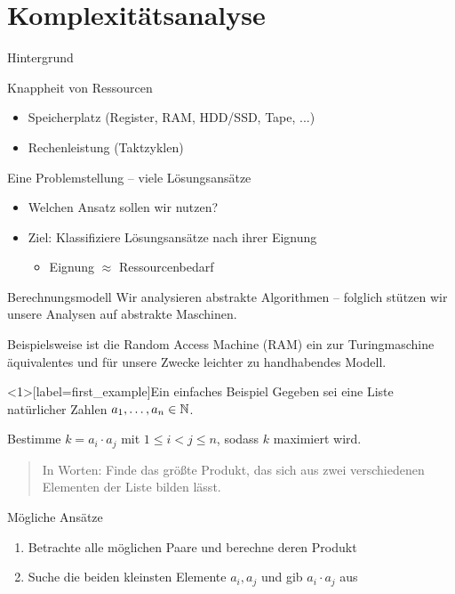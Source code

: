 \section{Komplexit\"atsanalyse}

\begin{frame}{Hintergrund}
\begin{block}{Knappheit von Ressourcen}
    \begin{itemize}
        \item Speicherplatz (Register, RAM, HDD/SSD, Tape, ...)
        \item \alert{Rechenleistung} (Taktzyklen)
    \end{itemize}
\end{block}

\begin{block}{Eine Problemstellung -- viele Lösungsansätze}
    \begin{itemize}
        \item Welchen Ansatz sollen wir nutzen?
        \item Ziel: Klassifiziere Lösungsansätze nach ihrer \alert{Eignung}
        \begin{itemize}
            \item Eignung $\approx$ Ressourcenbedarf
        \end{itemize}
    \end{itemize}
\end{block}
\end{frame}

\begin{frame}{Berechnungsmodell}
Wir analysieren \alert{abstrakte Algorithmen} -- folglich st\"utzen wir unsere Analysen auf \alert{abstrakte Maschinen}.

Beispielsweise ist die \alert{Random Access Machine (RAM)} ein zur \alert{Turingmaschine} \"aquivalentes und f\"ur unsere Zwecke leichter zu handhabendes Modell.
\end{frame}

\begin{frame}<1>[label=first_example]{Ein einfaches Beispiel}
Gegeben sei eine Liste natürlicher Zahlen $a_1, \dots, a_n \in \mathbb{N}$.

Bestimme $k = a_i \cdot a_j$ mit $1 \leq i < j \leq n$, sodass $k$ \alert{maximiert} wird.

\begin{quote}
    In Worten: Finde das \alert{gr\"o{\ss}te} Produkt, das sich aus zwei \alert{verschiedenen} Elementen der Liste bilden lässt.
\end{quote}

\begin{block}{M\"ogliche Ans\"atze}
    \begin{enumerate}
        \item<1-> Betrachte alle möglichen Paare und berechne deren Produkt
        \pause
        \item<3-> Suche die beiden kleinsten Elemente $a_i, a_j$ und gib $a_i \cdot a_j$ aus
    \end{enumerate}
\end{block}
\end{frame}

